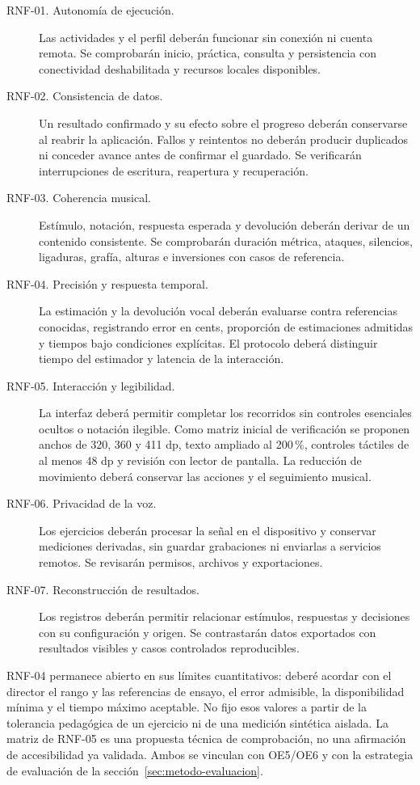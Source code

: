 \begin{description}
\item[RNF-01. Autonomía de ejecución.] Las actividades y el perfil deberán funcionar
sin conexión ni cuenta remota. Se comprobarán inicio, práctica, consulta y
persistencia con conectividad deshabilitada y recursos locales disponibles.
\item[RNF-02. Consistencia de datos.] Un resultado confirmado y su efecto sobre el
progreso deberán conservarse al reabrir la aplicación. Fallos y reintentos no
deberán producir duplicados ni conceder avance antes de confirmar el guardado.
Se verificarán interrupciones de escritura, reapertura y recuperación.
\item[RNF-03. Coherencia musical.] Estímulo, notación, respuesta esperada y devolución
deberán derivar de un contenido consistente. Se comprobarán duración métrica,
ataques, silencios, ligaduras, grafía, alturas e inversiones con casos de referencia.
\item[RNF-04. Precisión y respuesta temporal.] La estimación y la devolución vocal
deberán evaluarse contra referencias conocidas, registrando error en cents,
proporción de estimaciones admitidas y tiempos bajo condiciones explícitas.
El protocolo deberá distinguir tiempo del estimador y latencia de la interacción.
\item[RNF-05. Interacción y legibilidad.] La interfaz deberá permitir completar los
recorridos sin controles esenciales ocultos o notación ilegible. Como matriz
inicial de verificación se proponen anchos de 320, 360 y 411 dp, texto ampliado
al 200\,\%, controles táctiles de al menos 48 dp y revisión con lector de pantalla.
La reducción de movimiento deberá conservar las acciones y el seguimiento musical.
\item[RNF-06. Privacidad de la voz.] Los ejercicios deberán procesar la señal en
el dispositivo y conservar mediciones derivadas, sin guardar grabaciones ni
enviarlas a servicios remotos. Se revisarán permisos, archivos y exportaciones.
\item[RNF-07. Reconstrucción de resultados.] Los registros deberán permitir relacionar
estímulos, respuestas y decisiones con su configuración y origen. Se contrastarán
datos exportados con resultados visibles y casos controlados reproducibles.
\end{description}

RNF-04 permanece abierto en sus límites cuantitativos: deberé acordar con el
director el rango y las referencias de ensayo, el error admisible, la disponibilidad
mínima y el tiempo máximo aceptable. No fijo esos valores a partir de la tolerancia
pedagógica de un ejercicio ni de una medición sintética aislada. La matriz de
RNF-05 es una propuesta técnica de comprobación, no una afirmación de accesibilidad
ya validada. Ambos se vinculan con OE5/OE6 y con la estrategia de evaluación de
la sección~\ref{sec:metodo-evaluacion}.

